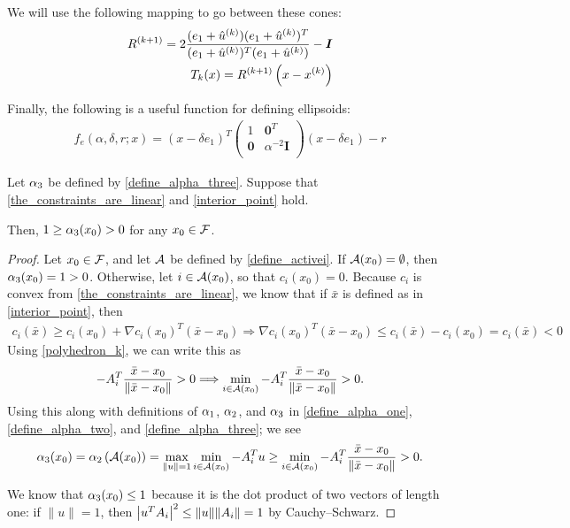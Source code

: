 We will use the following mapping to go between these cones:
\begin{align}
{R^{(k+1)}} = 2\frac{(e_1 + {{{\hat u}^{(k)}}})(e_1 +{{{\hat u}^{(k)}}})^T}{(e_1 +{{{\hat u}^{(k)}}})^T(e_1 +{{{\hat u}^{(k)}}})} - \boldsymbol I \label{define_r} \\
T_k(x) = {R^{(k+1)}}\left(x - x^{(k)}\right) \label{define_affine_mapping}
\end{align}

Finally, the following is a useful function for defining ellipsoids:
\begin{align}
f_{e}(\alpha, \delta, r; x) = (x - \delta e_1)^T\begin{pmatrix}
1 & \boldsymbol0^T \\
\boldsymbol 0 & \alpha^{-2} \boldsymbol I \\
\end{pmatrix}(x - \delta e_1) - r \label{define_ellipsoid_function}
\end{align}


\begin{lemma}
\label{alphas_are_positive}
Let ${\alpha_3}$ be defined by \cref{define_alpha_three}.
Suppose that \cref{the_constraints_are_linear} and \cref{interior_point} hold.

Then, $1 \ge {\alpha_3}(x_0) > 0$ for any $x_0 \in {\mathcal F}$. 
\end{lemma}

\begin{proof}
Let $x_0 \in {\mathcal F}$, and let ${\mathcal A}$ be defined by \cref{define_activei}.
If ${\mathcal A}(x_0) = \emptyset$, then ${\alpha_3}(x_0) = 1 > 0$.
Otherwise, let $i \in {\mathcal A}(x_0)$, so that $c_i(x_0) = 0$.
Because $c_i$ is convex from \cref{the_constraints_are_linear}, we know that if $\bar x$ is defined as in \cref{interior_point}, then
\begin{align*}
c_i(\bar x) \ge c_i(x_0) + \nabla c_i(x_0)^T(\bar x - x_0)
\Longrightarrow \nabla c_i(x_0)^T(\bar x - x_0) \le c_i(\bar x) - c_i(x_0) = c_i(\bar x) < 0
\end{align*}
Using \cref{polyhedron_k}, we can write this as
\begin{align*}
-{{A}}^T_i\frac {\bar x - x_0}{\|\bar x - x_0\|} > 0  \Longrightarrow \min_{i \in {\mathcal A}(x_0)} -{{A}}_i^T\frac {\bar x - x_0}{\|\bar x - x_0\|} > 0.
\end{align*}
Using this along with definitions of ${\alpha_1}$, ${\alpha_2}$, and ${\alpha_3}$ in \cref{define_alpha_one}, \cref{define_alpha_two}, and \cref{define_alpha_three}; we see
\begin{align*}
{\alpha_3}(x_0) = {\alpha_2}\left({\mathcal A}(x_0)\right) = \max_{\|u\| = 1} \min_{i \in {\mathcal A}(x_0)} -{{A}}_i^Tu
\ge \min_{i \in {\mathcal A}(x_0)} - {{A}}_i^T\frac {\bar x - x_0}{\|\bar x - x_0\|} > 0.
\end{align*}

We know that ${\alpha_3}(x_0) \le 1$ because it is the dot product of two vectors of length one:
if $\|u\| = 1$, then $\left|u^T {{A}}_i\right|^2 \le \|u\|\|{{A}}_i\| = 1$ by Cauchy–Schwarz.

\end{proof}

